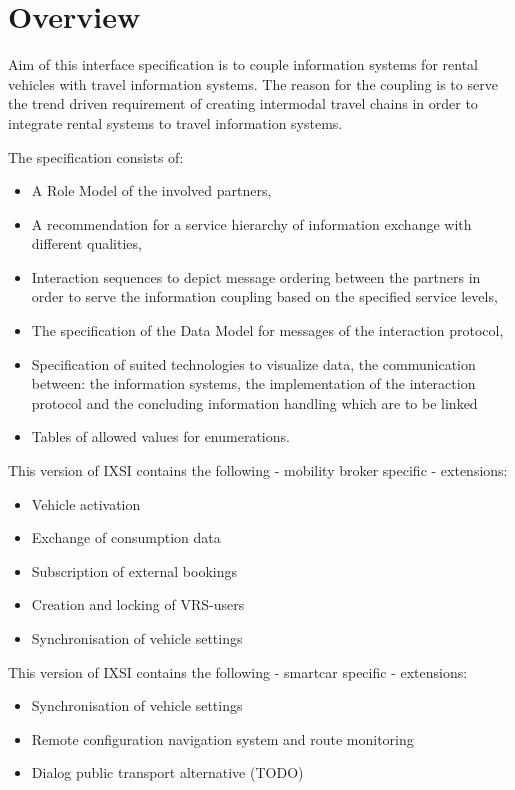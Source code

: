 \chapter{Overview}
\label{cha:Zusammenfassung}

Aim of this interface specification is to couple information systems for rental vehicles with travel information systems.
The reason for the coupling is to serve the trend driven requirement of creating intermodal travel chains in order to integrate rental systems to travel information systems.

The specification consists of:
\begin{itemize}
\item A Role Model of the involved partners,
\item A recommendation for a service hierarchy of information exchange with different qualities,
\item Interaction sequences to depict message ordering between the partners in order to serve the information coupling based on the specified service levels,
\item The specification of the Data Model for messages of the interaction protocol,
\item Specification of suited technologies to visualize data, the communication between: the information systems, the implementation of the interaction protocol and the concluding information handling which are to be linked
\item Tables of allowed values for enumerations.
\end{itemize}
This version of IXSI contains the following - mobility broker specific - extensions:
\begin{itemize}
	\item Vehicle activation 
	\item Exchange of consumption data 
	\item Subscription of external bookings
	\item Creation and locking of VRS-users
	\item Synchronisation of vehicle settings 
\end{itemize}
This version of IXSI contains the following -  smartcar specific - extensions:
\begin{itemize}
	\item Synchronisation of vehicle settings
	\item Remote configuration navigation system and route monitoring
	\item Dialog public transport alternative (TODO)
\end{itemize}
